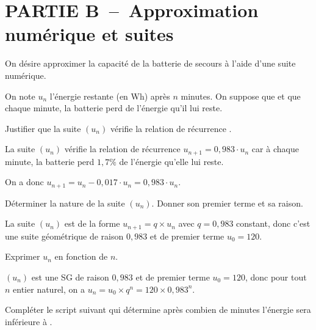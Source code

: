 \medskip

    \section*{PARTIE B~--~Approximation numérique et suites}


    On désire approximer la capacité de la batterie de secours à l'aide d'une suite numérique.

    On note $u_n$ l'énergie restante (en Wh) après $n$ minutes. On suppose que  et que chaque minute, la batterie perd  de l'énergie qu'il lui reste.


\begin{enumerate}[series=monDS, resume]
    \item Justifier que la suite $(u_n)$ vérifie la relation de récurrence .
    \begin{blocvisiblex}[height=3.]
    {\quad}
    La suite $(u_n)$ vérifie la relation de récurrence $u_{n+1}=0,983\cdot u_n$ car à chaque minute, la batterie perd $1,7\%$ de l'énergie qu'elle lui reste.

    On a donc $u_{n+1}=u_n-0,017\cdot u_n=0,983\cdot u_n$.

    \end{blocvisiblex}
    \medskip
    \item Déterminer la nature de la suite $(u_n)$. Donner son premier terme et sa raison. 
    \begin{blocvisiblex}[height=2]
    {\quad}

    La suite $(u_n)$ est de la forme $u_{n+1}=q \times u_n$ avec $q=0,983$ constant, donc c'est une suite géométrique de raison $0,983$ et de premier terme $u_0=120$.
    \end{blocvisiblex}
    \medskip
    \item Exprimer $u_n$ en fonction de $n$. 
    \begin{blocvisiblex}[height=1.5]
    {\quad}
    $(u_n)$ est une SG de raison $0,983$ et de premier terme $u_0=120$, donc pour tout $n$ entier naturel, on a $u_n=u_0 \times q^n=120 \times 0,983^n$.
    \end{blocvisiblex}
    \medskip

    \begin{minipage}{0.44\textwidth}
            \item Compléter le script suivant qui détermine après combien de minutes l'énergie sera inférieure à .


\end{minipage}
\end{enumerate}
